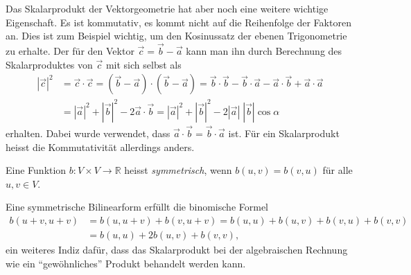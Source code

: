 Das Skalarprodukt der Vektorgeometrie hat aber noch eine weitere
wichtige Eigenschaft.
Es ist kommutativ, es kommt nicht auf die Reihenfolge der Faktoren an.
Dies ist zum Beispiel wichtig, um den Kosinussatz der ebenen Trigonometrie
zu erhalte.
Der für den Vektor
%
%
$\vec{c} = \vec{b}-\vec{a}$ 
kann man ihn durch Berechnung des Skalarproduktes von $\vec{c}$ mit
sich selbst als
\begin{align*}
|\vec{c}|^2
&=
\vec{c}\cdot\vec{c}
=
(\vec{b}-\vec{a})\cdot(\vec{b}-\vec{a})
=
\vec{b}\cdot\vec{b}
-
\vec{b}\cdot\vec{a}
-
\vec{a}\cdot\vec{b}
+
\vec{a}\cdot\vec{a}
\\
&=
|\vec{a}|^2 + |\vec{b}|^2 - 2 \vec{a}\cdot\vec{b}
=
|\vec{a}|^2 + |\vec{b}|^2 - 2 |\vec{a}|\;|\vec{b}|\cos\alpha
\end{align*}
erhalten.
Dabei wurde verwendet, dass $\vec{a}\cdot\vec{b}=\vec{b}\cdot\vec{a}$ ist.
Für ein Skalarprodukt heisst die Kommutativität allerdings anders.

\begin{definition}[symmetrisch]
Eine Funktion $b\colon V\times V \to\mathbb{R}$ heisst {\em symmetrisch},
wenn $b(u,v)=b(v,u)$ für alle $u,v\in V$.
%
\end{definition}

Eine symmetrische Bilinearform erfüllt die binomische Formel
%
\begin{align*}
b(u+v,u+v)
&=
b(u,u+v) + b(v,u+v)
=
b(u,u)+b(u,v)+b(v,u)+b(v,v)
\\
&=
b(u,u) + 2b(u,v) + b(v,v),
\end{align*}
ein weiteres Indiz dafür, dass das Skalarprodukt bei der algebraischen
Rechnung wie ein ``gewöhnliches'' Produkt behandelt werden kann.

